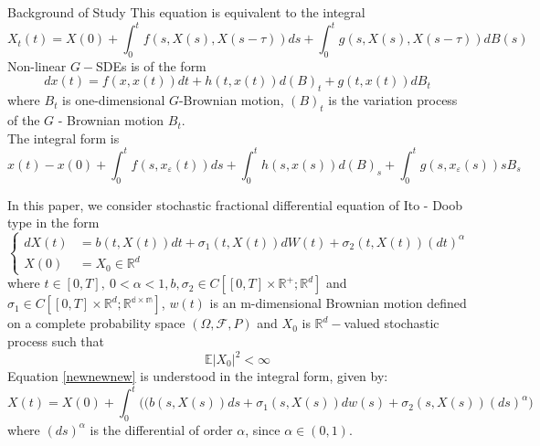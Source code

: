 \documentclass[unknownkeysallowed, compress]{beamer}
\theoremstyle{plain}
\begin{document}
\begin{frame}[allowframebreaks]{Background of Study}
This equation is equivalent to the integral
\begin{equation}\label{new1.14}
    X_t(t) = X(0)+\int_0^tf(s,X(s),X(s-\tau))ds+\int_0^tg(s,X(s), X(s-\tau))dB(s)
\end{equation}
Non-linear $G-$SDEs is of the form
\begin{equation}\label{new1.15}
dx(t) = f(x,x(t))dt+h(t,x(t))d(B)_t+g(t,x(t))dB_t
\end{equation}
where $B_t$ is one-dimensional $G$-Brownian motion, $(B)_t$ is the variation process of the $G$ - Brownian motion $B_t$.\\
The integral form is
\begin{equation}
    x(t)-x(0)+\int_0^tf(s,x_\varepsilon(t))ds+\int_0^th(s,x(s))d(B)_s+\int_0^t g(s,x_\varepsilon(s))sB_s
\end{equation}
\par In this paper, we consider stochastic fractional differential equation of Ito - Doob type in the form
\begin{equation}\label{newnewnew}
\left\{
\begin{split}
dX(t) & = b(t,X(t))dt+\sigma_1(t,X(t))dW(t)+\sigma_2(t,X(t))(dt)^\alpha\\
X(0)& = X_0\in\mathbb{R}^d
\end{split}
\right.
\end{equation}
where $t\in[0,T],~0<\alpha<1,b,\sigma_2\in C[[0,T]\times\mathbb{R}^+;\mathbb{R}^d]$ and $\sigma_1\in C[[0,T]\times \mathbb{R}^d;\mathbb{R^{d\times m}}]$, $w(t)$ is an m-dimensional Brownian motion defined on a complete probability space $(\Omega,\mathcal{F},P)$ and $X_0$ is $\mathbb{R}^d-$valued stochastic process such that
\begin{equation}
\mathbb{E}|X_0|^2<\infty
\end{equation}
Equation \eqref{newnewnew} is understood in the integral form, given by: %
$$
X(t) = X(0)+\int_0^t\bigg((b(s,X(s))ds+\sigma_1(s,X(s))dw(s)+\sigma_2(s,X(s))(ds)^\alpha\bigg)
$$
where $(ds)^\alpha$ is the differential of order $\alpha$, since $\alpha\in(0,1)$.
\end{frame}
\end{document}

